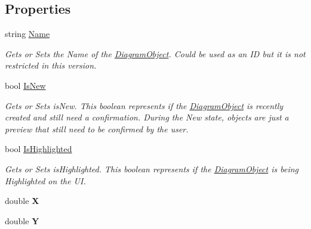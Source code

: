 \subsection*{Properties}
\begin{DoxyCompactItemize}
\item 
string \hyperlink{class_prototipo_t_f_g_1_1_diagram_object_a3c812a834f7026cc36116d1c35106060}{Name}
\begin{DoxyCompactList}\small\item\em Gets or Sets the Name of the \hyperlink{class_prototipo_t_f_g_1_1_diagram_object}{Diagram\+Object}. Could be used as an I\+D but it is not restricted in this version. \end{DoxyCompactList}\item 
bool \hyperlink{class_prototipo_t_f_g_1_1_diagram_object_a9f0c482af0abba2fc1f763fdae8fa23f}{Is\+New}
\begin{DoxyCompactList}\small\item\em Gets or Sets is\+New. This boolean represents if the \hyperlink{class_prototipo_t_f_g_1_1_diagram_object}{Diagram\+Object} is recently created and still need a confirmation. During the New state, objects are just a preview that still need to be confirmed by the user. \end{DoxyCompactList}\item 
bool \hyperlink{class_prototipo_t_f_g_1_1_diagram_object_ae5123201b41c4595b46049a92ea3d962}{Is\+Highlighted}
\begin{DoxyCompactList}\small\item\em Gets or Sets is\+Highlighted. This boolean represents if the \hyperlink{class_prototipo_t_f_g_1_1_diagram_object}{Diagram\+Object} is being Highlighted on the U\+I. \end{DoxyCompactList}\item 
\hypertarget{class_prototipo_t_f_g_1_1_diagram_object_a3ef1b64848cd65c5e114f93f28c85889}{}double {\bfseries X}\label{class_prototipo_t_f_g_1_1_diagram_object_a3ef1b64848cd65c5e114f93f28c85889}

\item 
\hypertarget{class_prototipo_t_f_g_1_1_diagram_object_a5e6edb7d1e1c2d8e63197fe3685f4f93}{}double {\bfseries Y}\label{class_prototipo_t_f_g_1_1_diagram_object_a5e6edb7d1e1c2d8e63197fe3685f4f93}

\end{DoxyCompactItemize}

